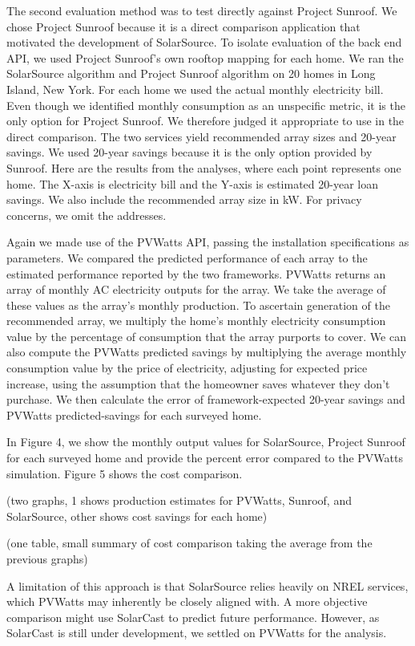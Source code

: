 \documentclass[pageno]{jpaper}
\begin{document}
The second evaluation method was to test directly against Project Sunroof. We chose Project Sunroof because it is a direct comparison application that motivated the development of SolarSource. To isolate evaluation of the back end API, we used Project Sunroof's own rooftop mapping for each home. We ran the SolarSource algorithm and Project Sunroof algorithm on 20 homes in Long Island, New York. For each home we used the actual monthly electricity bill. Even though we identified monthly consumption as an unspecific metric, it is the only option for Project Sunroof. We therefore judged it appropriate to use in the direct comparison. The two services yield recommended array sizes and 20-year savings. We used 20-year savings because it is the only option provided by Sunroof. Here are the results from the analyses, where each point represents one home. The X-axis is electricity bill and the Y-axis is estimated 20-year loan savings. We also include the recommended array size in kW. For privacy concerns, we omit the addresses. 

Again we made use of the PVWatts API, passing the installation specifications as parameters. We compared the predicted performance of each array to the estimated performance reported by the two frameworks. PVWatts returns an array of monthly AC electricity outputs for the array. We take the average of these values as the array's monthly production. To ascertain generation of the recommended array, we multiply the home's monthly electricity consumption value by the percentage of consumption that the array purports to cover. We can also compute the PVWatts predicted savings by multiplying the average monthly consumption value by the price of electricity, adjusting for expected price increase, using the assumption that the homeowner saves whatever they don't purchase. We then calculate the error of framework-expected 20-year savings and PVWatts predicted-savings for each surveyed home.

 In Figure 4, we show the monthly output values for SolarSource, Project Sunroof for each surveyed home and provide the percent error compared to the PVWatts simulation. Figure 5 shows the cost comparison.
 
 (two graphs, 1 shows production estimates for PVWatts, Sunroof, and SolarSource, other shows cost savings for each home)
 
 (one table, small summary of cost comparison taking the average from the previous graphs)

A limitation of this approach is that SolarSource relies heavily on NREL services, which PVWatts may inherently be closely aligned with. A more objective comparison might use SolarCast to predict future performance. However, as SolarCast is still under development, we settled on PVWatts for the analysis. 
\end{document}
